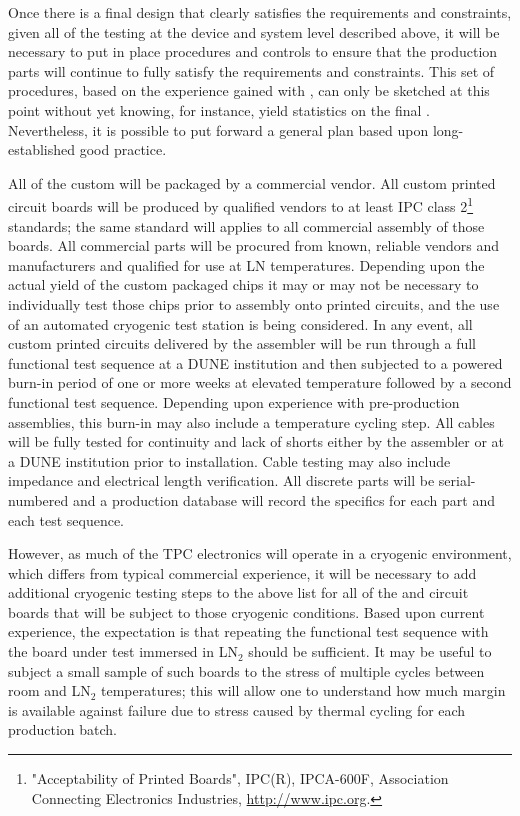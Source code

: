 Once there is a final design that clearly satisfies the requirements and constraints, given all of the testing at the device and system level described above, it will be necessary to put in place procedures and controls to ensure that the production  parts will continue to fully satisfy the requirements and constraints. This set of  procedures, based on the experience gained with , can only be sketched at this point without yet knowing, for instance, yield statistics on the final . Nevertheless, it is possible to put forward a general plan based upon long-established good practice.

All of the custom  will be packaged by a commercial vendor. 
All custom printed circuit boards will be produced by qualified vendors to at least IPC class 2\footnote{ "Acceptability of Printed Boards", IPC(R), IPCA-600F, Association Connecting Electronics Industries\texttrademark{}, \url{http://www.ipc.org}.} standards; the same standard will applies to all commercial assembly of those boards. 
All commercial parts will be procured from known, reliable vendors and manufacturers and qualified for use at LN temperatures. Depending upon the actual yield of the custom packaged chips it may or may not be necessary to individually test those chips prior to assembly onto printed circuits, and the use of an automated cryogenic test station is being considered. In any event, all custom printed circuits delivered by the assembler will be run through a full functional test sequence at a DUNE institution and then subjected to a powered burn-in period of one or more weeks at elevated temperature followed by a second functional test sequence. Depending upon experience with pre-production assemblies, this burn-in may also include a temperature cycling step. All cables will be fully tested for continuity and lack of shorts either by the assembler or at a DUNE institution prior to installation. Cable testing may also include impedance and electrical length verification. All discrete  parts will be serial-numbered and a production database will record the specifics for each part and each test sequence.

However, as much of the \spmod %
TPC electronics will operate in a cryogenic environment, which differs from typical commercial experience, it will be necessary to add additional cryogenic testing steps to the above list for all of the  and circuit boards that will be subject to those cryogenic conditions. Based upon current experience, the expectation is that repeating the functional test sequence with the board under test immersed in LN$_2$ should be sufficient. It may be useful to subject a small sample of such boards to the stress of multiple cycles between room and LN$_2$ temperatures; this will allow one to understand how much margin is available against failure due to stress caused by thermal cycling for each production batch.


